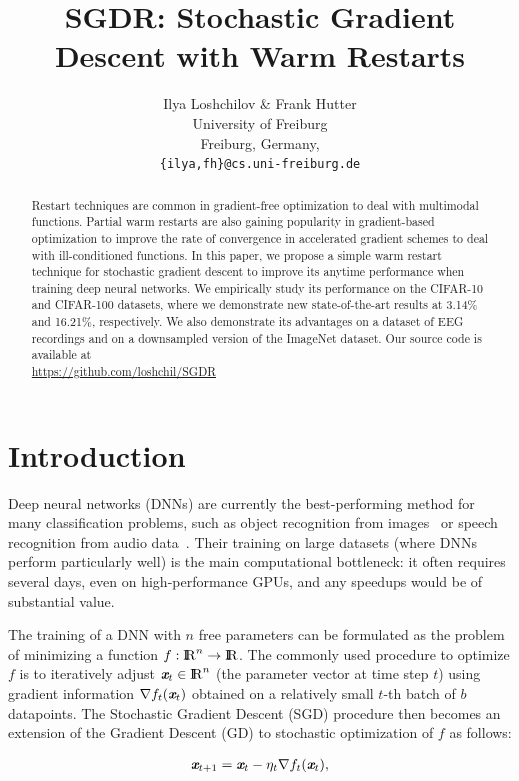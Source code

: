 \documentclass{article}
\title{SGDR: Stochastic Gradient Descent with Warm Restarts}
\author{Ilya Loshchilov \& Frank Hutter \\
University of Freiburg\\
Freiburg, Germany, \\
\texttt{\{ilya,fh\}@cs.uni-freiburg.de} 
}
\def\R{{\rm I\hspace{-0.50ex}R}}
\newcommand{\vc}[1]{\textit{\textbf{#1}}}
\begin{document}
\maketitle

\begin{abstract}  
Restart techniques are common in gradient-free optimization to deal 
with multimodal functions. 
Partial warm restarts are also gaining popularity in gradient-based optimization 
to improve the rate of convergence in accelerated gradient schemes  
to deal with ill-conditioned functions.
In this paper, we propose a simple warm restart technique for stochastic gradient descent 
to improve its anytime performance when training deep neural networks. 
We empirically study its performance on the CIFAR-10 and CIFAR-100 datasets,   
where we demonstrate new state-of-the-art results at 3.14\% and 16.21\%, respectively. 
We also demonstrate its advantages on a dataset of EEG recordings and on a downsampled version of the ImageNet dataset.  
Our source code is available at \\ \url{https://github.com/loshchil/SGDR}
\end{abstract}

\section{Introduction}

Deep neural networks (DNNs) are currently the best-performing method for many classification problems, such
as object recognition from images~\citep{Krizhevsky2012,Donahue_ICML2014} or speech recognition
from audio data~\citep{Deng13newtypes}. Their training on large datasets (where DNNs perform particularly well) is the main  computational bottleneck: it often requires several days, even on high-performance GPUs, and any speedups would be of substantial value.

The training of a DNN with $n$ free parameters can be formulated as the problem of minimizing a function $f: \R^n \rightarrow \R$. The commonly used procedure to optimize $f$ is to iteratively adjust $\vc{x}_t \in \R^n$ (the parameter vector at time step $t$) using gradient information $\nabla f_t(\vc{x}_t)$ obtained on a relatively small $t$-th batch of $b$ datapoints. The Stochastic Gradient Descent (SGD) procedure then becomes an extension of the Gradient Descent (GD) to stochastic optimization of $f$ as follows:

\begin{eqnarray}
	\label{eq:sgd}
	\vc{x}_{t+1} = \vc{x}_t - \eta_t \nabla f_t(\vc{x}_t),
\end{eqnarray}
\end{document}
